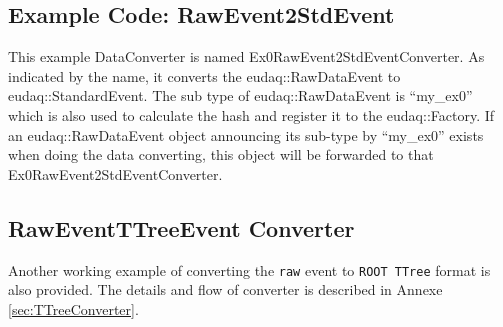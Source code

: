 \subsection{Example Code: RawEvent2StdEvent}\label{sec:Ex0RawEvent2StdEventConverter_cc}
This example DataConverter is named Ex0RawEvent2StdEventConverter. As indicated by the name, it converts the eudaq::RawDataEvent to eudaq::StandardEvent. The sub type of eudaq::RawDataEvent is ``my\_ex0'' which is also used to calculate the hash and register it to the eudaq::Factory. If an eudaq::RawDataEvent object announcing its sub-type by ``my\_ex0'' exists when doing the data converting, this object will be forwarded to that Ex0RawEvent2StdEventConverter.



\subsection{RawEventTTreeEvent Converter}
\label{sec:RawEvent2TTreeEventConverter}

Another working example of converting the \texttt{raw} event to \texttt{ROOT TTree} format is also provided. The details and flow of converter is described in Annexe \ref{sec:TTreeConverter}.



 
